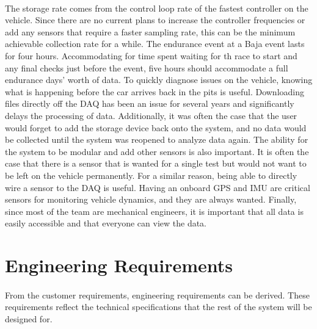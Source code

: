 \paragraph{}
The storage rate comes from the control loop rate of the fastest controller on the vehicle.
Since there are no current plans to increase the controller frequencies or add any sensors that require a faster sampling rate, this can be the minimum achievable collection rate for a while.
The endurance event at a Baja event lasts for four hours.
Accommodating for time spent waiting for th race to start and any final checks just before the event, five hours should accommodate a full endurance days' worth of data.
To quickly diagnose issues on the vehicle, knowing what is happening before the car arrives back in the pits is useful.
Downloading files directly off the DAQ has been an issue for several years and significantly delays the processing of data.
Additionally, it was often the case that the user would forget to add the storage device back onto the system, and no data would be collected until the system was reopened to analyze data again.
The ability for the system to be modular and add other sensors is also important.
It is often the case that there is a sensor that is wanted for a single test but would not want to be left on the vehicle permanently.
For a similar reason, being able to directly wire a sensor to the DAQ is useful.
Having an onboard GPS and IMU are critical sensors for monitoring vehicle dynamics, and they are always wanted.
Finally, since most of the team are mechanical engineers, it is important that all data is easily accessible and that everyone can view the data.

\section{Engineering Requirements}

\paragraph{}
From the customer requirements, engineering requirements can be derived.
These requirements reflect the technical specifications that the rest of the system will be designed for.

